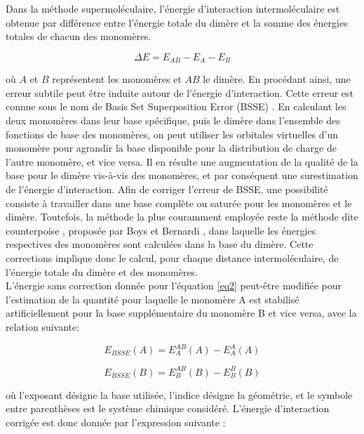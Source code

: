 \documentclass[12pt,a4paper]{book}
\begin{document}
	Dans la méthode supermoléculaire, l’énergie d’interaction intermoléculaire est obtenue par différence entre l’énergie totale du dimère et la somme des énergies totales de chacun des monomères.
	
	\begin{equation}
	\Delta E = E_{AB} - E_{A} - E_{B} \label{eq2}
	\end{equation}
	
	\noindent où $A$ et $B$ représentent les monomères et $AB$ le dimère. En procédant ainsi, une erreur subtile peut être induite autour de l’énergie d’interaction. Cette erreur est connue sous le nom de \og Basis Set Superposition Error \fg{} (BSSE) \cite{sherrill2010counterpoise}. En calculant les deux monomères dans leur base spécifique, puis le dimère dans l’ensemble des fonctions de base des monomères, on peut utiliser les orbitales virtuelles d’un monomère pour agrandir la base disponible pour la distribution de charge de l’autre monomère, et vice versa. Il en résulte une augmentation de la qualité de la base pour le dimère vis-à-vis des monomères, et par conséquent une surestimation de l’énergie d'interaction. Afin de corriger l’erreur de BSSE, une possibilité consiste à travailler dans une base complète ou saturée pour les monomères et le dimère. Toutefois, la méthode la plus couramment employée reste la méthode dite \og counterpoise \fg, proposée par Boys et Bernardi \cite{boys1970calculation}, dans laquelle les énergies respectives des monomères sont calculées dans la base du dimère. Cette corrections implique donc le calcul, pour chaque distance intermoléculaire, de l’énergie totale du dimère et des monomères.\\
	
	L’énergie sans correction donnée pour l’équation \ref{eq2} peut-être modifiée pour l'estimation de la quantité pour laquelle le monomère A est stabilisé artificiellement pour la base supplémentaire du monomère B et vice versa, avec la relation suivante:
	
	\begin{equation}
	E_{BSSE}(A) = E_{A}^{AB}(A) - E_{A}^{A}(A)
	\end{equation}
	
	\begin{equation}
	E_{BSSE}(B) = E_{B}^{AB}(B) - E_{B}^{B}(B)
	\end{equation}
	
	\noindent où l'exposant désigne la base utilisée, l'indice désigne la géométrie, et le symbole entre parenthèses est le système chimique considéré.
	L'énergie d'interaction corrigée est donc donnée par l'expression suivante :
	
\end{document}
